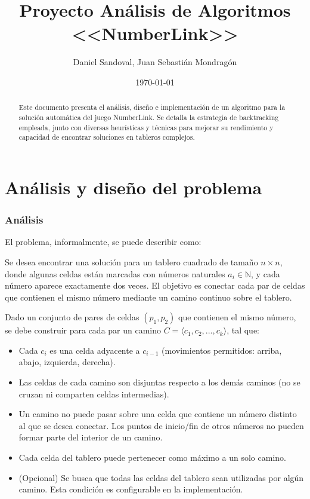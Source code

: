 \documentclass[spanish]{article}
\numberwithin{equation}{section}
\numberwithin{figure}{section}
\theoremstyle{definition}
\begin{document}
\title{%
Proyecto Análisis de Algoritmos <<NumberLink>>}
\author{%
Daniel Sandoval, Juan Sebastián Mondragón}
\date{%
\today}
\maketitle
\begin{abstract}
Este documento presenta el análisis, diseño e implementación de un algoritmo para la solución automática del juego NumberLink. Se detalla la estrategia de backtracking empleada, junto con diversas heurísticas y técnicas para mejorar su rendimiento y capacidad de encontrar soluciones en tableros complejos.
\end{abstract}

\part{Análisis y diseño del problema}

\section{Análisis}

El problema, informalmente, se puede describir como:

Se desea encontrar una solución para un tablero cuadrado de tamaño $n \times n$, donde algunas celdas están marcadas con números naturales $a_i \in \mathbb{N}$, y cada número aparece exactamente dos veces. El objetivo es conectar cada par de celdas que contienen el mismo número mediante un camino continuo sobre el tablero.

Dado un conjunto de pares de celdas $(p_1, p_2)$ que contienen el mismo número, se debe construir para cada par un camino $C = \langle c_1, c_2, ..., c_k \rangle$, tal que:

\begin{itemize}
    \item Cada $c_i$ es una celda adyacente a $c_{i-1}$ (movimientos permitidos: arriba, abajo, izquierda, derecha).
    \item Las celdas de cada camino son disjuntas respecto a los demás caminos (no se cruzan ni comparten celdas intermedias).
    \item Un camino no puede pasar sobre una celda que contiene un número distinto al que se desea conectar. Los puntos de inicio/fin de otros números no pueden formar parte del interior de un camino.
    \item Cada celda del tablero puede pertenecer como máximo a un solo camino.
    \item (Opcional) Se busca que todas las celdas del tablero sean utilizadas por algún camino. Esta condición es configurable en la implementación.
\end{itemize}
\end{document}
